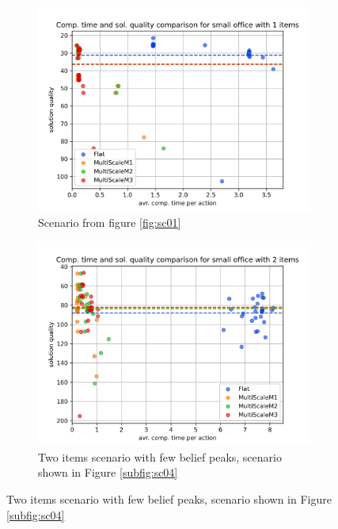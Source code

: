 \begin{figure}
    \centering
    \begin{subfigure}[b]{0.49\textwidth}
        \includegraphics[width=\textwidth]{Report/images/comp_time_vs_sol_quality/envsmall_sc01_scatter_comptimes_vs_solqual.png}
        \caption{Scenario from figure \ref{fig:sc01}}
        \label{subfig:comp_sc01}
    \end{subfigure}
    \begin{subfigure}[b]{0.49\textwidth}
         \includegraphics[width=\textwidth]{Report/images/comp_time_vs_sol_quality/envsmall_sc04_scatter_comptimes_vs_solqual.png}
        \caption{Two items scenario with few belief peaks, scenario shown in Figure \ref{subfig:sc04}}

\end{subfigure}
\end{figure}
